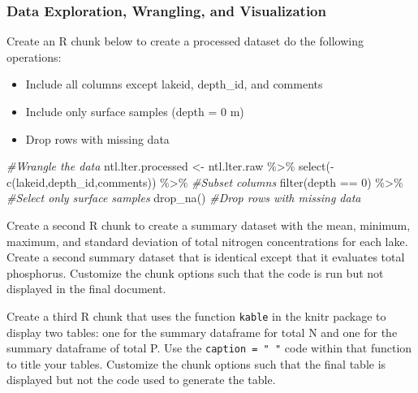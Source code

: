 \documentclass[
]{article}
\newenvironment{Shaded}{\begin{snugshade}}{\end{snugshade}}
\newcommand{\CommentTok}[1]{\textcolor[rgb]{0.56,0.35,0.01}{\textit{#1}}}
\newcommand{\DecValTok}[1]{\textcolor[rgb]{0.00,0.00,0.81}{#1}}
\newcommand{\FunctionTok}[1]{\textcolor[rgb]{0.00,0.00,0.00}{#1}}
\newcommand{\NormalTok}[1]{#1}
\newcommand{\OtherTok}[1]{\textcolor[rgb]{0.56,0.35,0.01}{#1}}
\newcommand{\SpecialCharTok}[1]{\textcolor[rgb]{0.00,0.00,0.00}{#1}}
\providecommand{\tightlist}{%
  \setlength{\itemsep}{0pt}\setlength{\parskip}{0pt}}
\begin{document}
\hypertarget{data-exploration-wrangling-and-visualization}{%
\subsubsection{Data Exploration, Wrangling, and
Visualization}\label{data-exploration-wrangling-and-visualization}}

Create an R chunk below to create a processed dataset do the following
operations:

\begin{itemize}
\tightlist
\item
  Include all columns except lakeid, depth\_id, and comments
\item
  Include only surface samples (depth = 0 m)
\item
  Drop rows with missing data
\end{itemize}

\begin{Shaded}
\begin{Highlighting}[]
\CommentTok{\#Wrangle the data}
\NormalTok{ntl.lter.processed }\OtherTok{\textless{}{-}}\NormalTok{ ntl.lter.raw }\SpecialCharTok{\%\textgreater{}\%} 
  \FunctionTok{select}\NormalTok{(}\SpecialCharTok{{-}}\FunctionTok{c}\NormalTok{(lakeid,depth\_id,comments)) }\SpecialCharTok{\%\textgreater{}\%} \CommentTok{\#Subset columns}
  \FunctionTok{filter}\NormalTok{(depth }\SpecialCharTok{==} \DecValTok{0}\NormalTok{) }\SpecialCharTok{\%\textgreater{}\%}                   \CommentTok{\#Select only surface samples}
  \FunctionTok{drop\_na}\NormalTok{()                                }\CommentTok{\#Drop rows with missing data}
\end{Highlighting}
\end{Shaded}

Create a second R chunk to create a summary dataset with the mean,
minimum, maximum, and standard deviation of total nitrogen
concentrations for each lake. Create a second summary dataset that is
identical except that it evaluates total phosphorus. Customize the chunk
options such that the code is run but not displayed in the final
document.

Create a third R chunk that uses the function \texttt{kable} in the
knitr package to display two tables: one for the summary dataframe for
total N and one for the summary dataframe of total P. Use the
\texttt{caption\ =\ "\ "} code within that function to title your
tables. Customize the chunk options such that the final table is
displayed but not the code used to generate the table.
\end{document}
